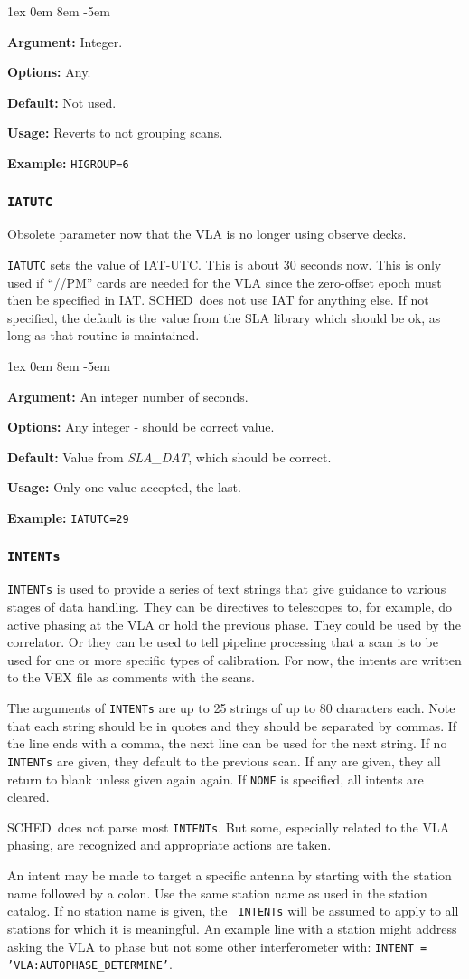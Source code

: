 \documentclass{report}
\newcommand{\schedb}{{\sc SCHED~}}
\newcommand{\rcwbox}[5]{
  \begin{list}{}{\parsep 1ex  \itemsep 0em
                 \leftmargin 8em  \itemindent -5em }
    \item {\bf Argument:} #1
    \item {\bf Options:}  #2
    \item {\bf Default:}  #3
    \item {\bf Usage:}    #4
    \item {\bf Example:}  #5
  \end{list}
}
\begin{document}
\rcwbox
{Integer.}
{Any.}
{Not used.}
{Reverts to not grouping scans.}
{{\tt HIGROUP=6}}


\subsubsection{\label{MP:IATUTC}{\tt IATUTC}}

Obsolete parameter now that the VLA is no longer using observe decks.

{\tt IATUTC} sets the value of IAT-UTC. This is about 30 seconds now.
This is only used if ``//PM'' cards are needed for the VLA since the
zero-offset epoch must then be specified in IAT. \schedb does not
use IAT for anything else.  If not specified, the default is the
value from the SLA library which should be ok, as long as that
routine is maintained.

\rcwbox
{An integer number of seconds.}
{Any integer - should be correct value.}
{Value from {\sl SLA\_DAT}, which should be correct.}
{Only one value accepted, the last.}
{{\tt IATUTC=29}}


\subsubsection{\label{MP:INTENTs}{\tt INTENTs}}

{\tt INTENTs} is used to provide a series of text strings that give
guidance to various stages of data handling.  They can be directives
to telescopes to, for example, do active phasing at the VLA or hold
the previous phase.  They could be used by the correlator.  Or they can
be used to tell pipeline processing that a scan is to be used for one or
more specific types of calibration.  For now, the intents are written
to the VEX file as comments with the scans.

The arguments of {\tt INTENTs} are up to 25 strings of up to 80
characters each.  Note that each string should be in quotes and they
should be separated by commas.  If the line ends with a comma, the
next line can be used for the next string.  If no {\tt INTENTs} are
given, they default to the previous scan.  If any are given, they all
return to blank unless given again again.  If {\tt NONE} is specified,
all intents are cleared.

\schedb does not parse most {\tt INTENTs}.  But some, especially related
to the VLA phasing, are recognized and appropriate actions are taken.

An intent may be made to target a specific antenna by starting with
the station name followed by a colon.  Use the same station name as
used in the station catalog.  If no station name is given, the {\tt
INTENTs} will be assumed to apply to all stations for which it is
meaningful.  An example line with a station might address asking the
VLA to phase but not some other interferometer with: 
{\tt INTENT = 'VLA:AUTOPHASE\_DETERMINE'}.
\end{document}
